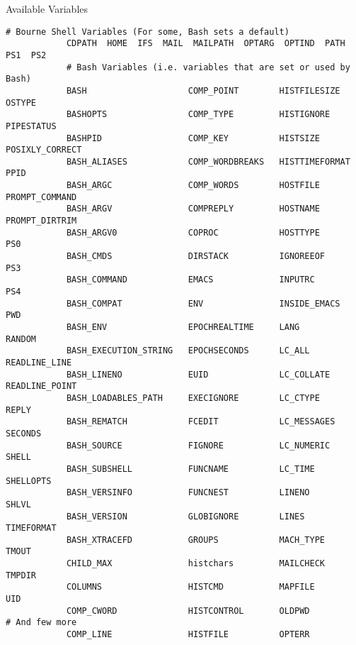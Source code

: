 \begin{frame}[fragile]{Available Variables}{}
    \vspace{-5mm}
    \begin{center}
        \begin{lstlisting}[style=MyBash, numbers=none, basicstyle={\ttfamily\tiny\color{basic-color}}]
            # Bourne Shell Variables (For some, Bash sets a default)
            CDPATH  HOME  IFS  MAIL  MAILPATH  OPTARG  OPTIND  PATH  PS1  PS2
            # Bash Variables (i.e. variables that are set or used by Bash)
            BASH                    COMP_POINT        HISTFILESIZE     OSTYPE
            BASHOPTS                COMP_TYPE         HISTIGNORE       PIPESTATUS
            BASHPID                 COMP_KEY          HISTSIZE         POSIXLY_CORRECT
            BASH_ALIASES            COMP_WORDBREAKS   HISTTIMEFORMAT   PPID
            BASH_ARGC               COMP_WORDS        HOSTFILE         PROMPT_COMMAND
            BASH_ARGV               COMPREPLY         HOSTNAME         PROMPT_DIRTRIM
            BASH_ARGV0              COPROC            HOSTTYPE         PS0
            BASH_CMDS               DIRSTACK          IGNOREEOF        PS3
            BASH_COMMAND            EMACS             INPUTRC          PS4
            BASH_COMPAT             ENV               INSIDE_EMACS     PWD
            BASH_ENV                EPOCHREALTIME     LANG             RANDOM
            BASH_EXECUTION_STRING   EPOCHSECONDS      LC_ALL           READLINE_LINE
            BASH_LINENO             EUID              LC_COLLATE       READLINE_POINT
            BASH_LOADABLES_PATH     EXECIGNORE        LC_CTYPE         REPLY
            BASH_REMATCH            FCEDIT            LC_MESSAGES      SECONDS
            BASH_SOURCE             FIGNORE           LC_NUMERIC       SHELL
            BASH_SUBSHELL           FUNCNAME          LC_TIME          SHELLOPTS
            BASH_VERSINFO           FUNCNEST          LINENO           SHLVL
            BASH_VERSION            GLOBIGNORE        LINES            TIMEFORMAT
            BASH_XTRACEFD           GROUPS            MACH_TYPE        TMOUT
            CHILD_MAX               histchars         MAILCHECK        TMPDIR
            COLUMNS                 HISTCMD           MAPFILE          UID
            COMP_CWORD              HISTCONTROL       OLDPWD           # And few more
            COMP_LINE               HISTFILE          OPTERR
        \end{lstlisting}
    \end{center}
\end{frame}
